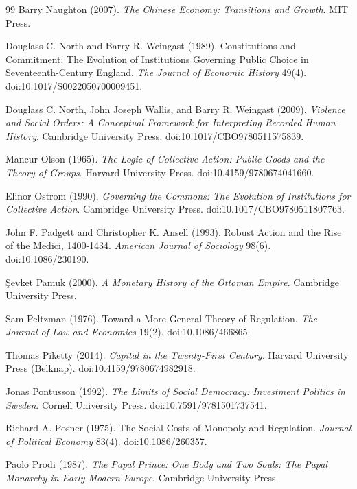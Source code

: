 \documentclass[11pt,letterpaper]{article}
\theoremstyle{definition}
\theoremstyle{remark}
\begin{document}
\begin{thebibliography}{99}
Barry Naughton (2007). \emph{The Chinese Economy: Transitions and Growth}. MIT Press.

Douglass C. North and Barry R. Weingast (1989). Constitutions and Commitment: The Evolution of Institutions Governing Public Choice in Seventeenth-Century England. \emph{The Journal of Economic History} 49(4). doi:10.1017/S0022050700009451.

Douglass C. North, John Joseph Wallis, and Barry R. Weingast (2009). \emph{Violence and Social Orders: A Conceptual Framework for Interpreting Recorded Human History}. Cambridge University Press. doi:10.1017/CBO9780511575839.

Mancur Olson (1965). \emph{The Logic of Collective Action: Public Goods and the Theory of Groups}. Harvard University Press. doi:10.4159/9780674041660.

Elinor Ostrom (1990). \emph{Governing the Commons: The Evolution of Institutions for Collective Action}. Cambridge University Press. doi:10.1017/CBO9780511807763.

John F. Padgett and Christopher K. Ansell (1993). Robust Action and the Rise of the Medici, 1400-1434. \emph{American Journal of Sociology} 98(6). doi:10.1086/230190.

\c{S}evket Pamuk (2000). \emph{A Monetary History of the Ottoman Empire}. Cambridge University Press.

Sam Peltzman (1976). Toward a More General Theory of Regulation. \emph{The Journal of Law and Economics} 19(2). doi:10.1086/466865.

Thomas Piketty (2014). \emph{Capital in the Twenty-First Century}. Harvard University Press (Belknap). doi:10.4159/9780674982918.

Jonas Pontusson (1992). \emph{The Limits of Social Democracy: Investment Politics in Sweden}. Cornell University Press. doi:10.7591/9781501737541.

Richard A. Posner (1975). The Social Costs of Monopoly and Regulation. \emph{Journal of Political Economy} 83(4). doi:10.1086/260357.

Paolo Prodi (1987). \emph{The Papal Prince: One Body and Two Souls: The Papal Monarchy in Early Modern Europe}. Cambridge University Press.


\end{thebibliography}
\end{document}
